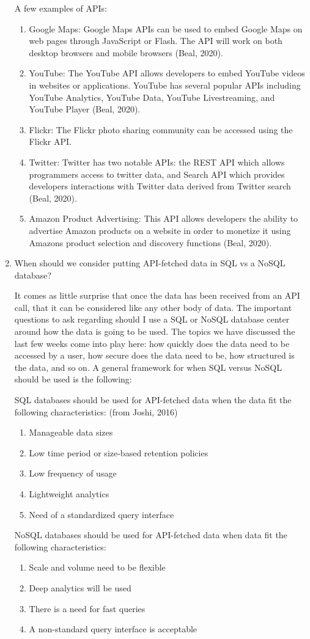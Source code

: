 \documentclass[]{article}
\begin{document}
\begin{enumerate}
\begin{enumerate}
\end{enumerate}
A few examples of APIs:
\begin{enumerate}
	\item Google Maps: Google Maps APIs can be used to embed Google Maps on web pages through JavaScript or Flash.  The API will work on both desktop browsers and mobile browsers (Beal, 2020).
	\item YouTube: The YouTube API allows developers to embed YouTube videos in websites or applications.  YouTube has several popular APIs including YouTube Analytics, YouTube Data, YouTube Livestreaming, and YouTube Player (Beal, 2020).
	\item Flickr: The Flickr photo sharing community can be accessed using the Flickr API.  
	\item Twitter:  Twitter has two notable APIs: the REST API which allows programmers access to twitter data, and Search API which provides developers interactions with Twitter data derived from Twitter search (Beal, 2020).
	\item Amazon Product Advertising: This API allows developers the ability to advertise Amazon products on a website in order to monetize it using Amazons product selection and discovery functions (Beal, 2020).
\end{enumerate}
	\item When should we consider putting API-fetched data in SQL vs a NoSQL database?
	
	It comes as little surprise that once the data has been received from an API call, that it can be considered like any other body of data.  The important questions to ask regarding should I use a SQL or NoSQL database center around how the data is going to be used.  The topics we have discussed the last few weeks come into play here: how quickly does the data need to be accessed by a user, how secure does the data need to be, how structured is the data, and so on.  A general framework for when SQL versus NoSQL should be used is the following:
	
	SQL databases should be used for API-fetched data when the data fit the following characteristics:
	(from Joshi, 2016)
	\begin{enumerate}
		\item Manageable data sizes
		\item Low time period or size-based retention policies
		\item Low frequency of usage
		\item Lightweight analytics
		\item Need of a standardized query interface
	\end{enumerate}
	NoSQL databases should be used for API-fetched data when data fit the following characteristics:
	\begin{enumerate}
		\item Scale and volume need to be flexible
		\item Deep analytics will be used
		\item There is a need for fast queries
		\item A non-standard query interface is acceptable
	\end{enumerate}


\end{enumerate}
\end{document}
